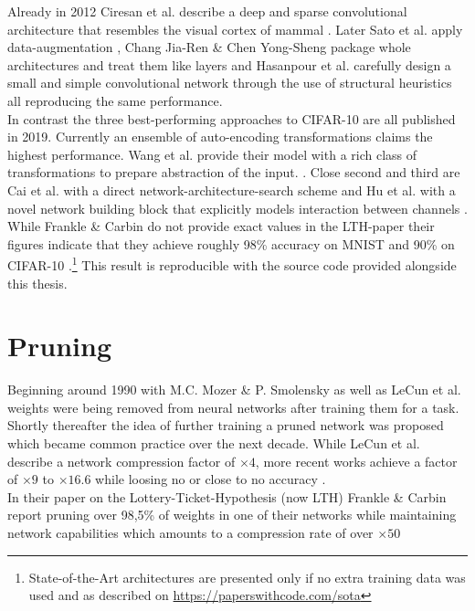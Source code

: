 Already in 2012 Ciresan et al. describe a deep and sparse convolutional architecture that resembles the visual cortex of mammal \cite{Multi-Column}. Later Sato et al. apply data-augmentation \cite{APAC}, Chang Jia-Ren \& Chen Yong-Sheng package whole architectures and treat them like layers \cite{Batch-Normalized} and Hasanpour et al. carefully design a small and simple convolutional network through the use of structural heuristics \cite{Keep-It-Simple} all reproducing the same performance.\\
In contrast the three best-performing approaches to CIFAR-10 are all published in 2019. Currently an ensemble of auto-encoding transformations claims the highest performance. Wang et al. provide their model with a rich class of transformations to prepare abstraction of the input. \cite{EnAET}. Close second and third are Cai et al. with a direct network-architecture-search scheme \cite{Direct-NAS} and Hu et al. with a novel network building block that explicitly models interaction between channels \cite{Squee}. \\ 
While Frankle \& Carbin do not provide exact values in the LTH-paper their figures indicate that they achieve roughly 98\% accuracy on MNIST and 90\% on CIFAR-10 \cite{Frankle2018}.\footnote
{State-of-the-Art architectures are presented only if no extra training data was used and as described on \href{https://paperswithcode.com/sota}{https://paperswithcode.com/sota}} This result is reproducible with the source code provided alongside this thesis.

\section{Pruning}
Beginning around 1990 with M.C. Mozer \& P. Smolensky \cite{Skeletonization} as well as LeCun et al. \cite{Optimal-Brain-Damage} weights were being removed from neural networks after training them for a task. Shortly thereafter the idea of further training a pruned network was proposed \cite{Optimal-Brain-Surgeon} which became common practice over the next decade. While LeCun et al. describe a network compression factor of $\times4$, more recent works achieve a factor of $\times9$ to $\times16.6$ while loosing no or close to no accuracy \cite{Learning_Weights_And_Connections} \cite{ThiNet}.\\
In their paper on the Lottery-Ticket-Hypothesis (now LTH) Frankle \& Carbin report pruning over 98,5\% of weights in one of their networks while maintaining network capabilities which amounts to a compression rate of over $\times50$


